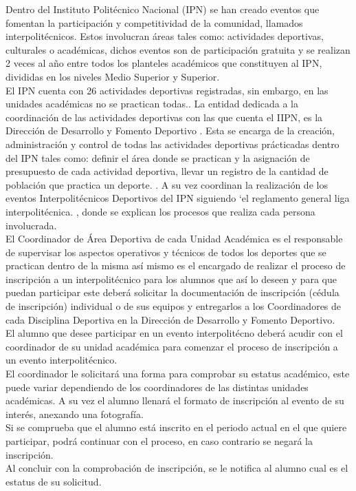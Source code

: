 	\noindent Dentro del Instituto Politécnico Nacional (IPN) se han creado eventos que fomentan la participación y competitividad de la comunidad, llamados interpolitécnicos. Estos involucran áreas tales como: actividades deportivas, culturales o académicas, dichos eventos son de participación gratuita y se realizan 2 veces al año entre todos los planteles académicos que constituyen al IPN, divididas en los niveles Medio Superior y Superior.  \cite{Reglas}\\
	\noindent El IPN cuenta con 26 actividades deportivas registradas, sin embargo, en las unidades académicas no se practican todas.\cite{Reglas}.
	\noindent La entidad dedicada a la coordinación de las actividades deportivas con las que cuenta el IIPN, es la Dirección de Desarrollo y Fomento Deportivo \cite{DDYFD}. Esta se encarga de la creación, administración y control de todas las actividades deportivas prácticadas dentro del IPN tales como: definir el área donde se practican y la asignación de presupuesto de cada actividad deportiva, llevar un registro de la cantidad de población que practica un deporte. \cite{Reglamento}.	
	\noindent A su vez coordinan la realización de los eventos Interpolitécnicos Deportivos del IPN siguiendo ‘el reglamento general liga interpolitécnica. \cite{Reglamento}, donde se explican los  procesos que realiza cada persona involucrada.\\
	
	\noindent El Coordinador de Área Deportiva de cada Unidad Académica es el responsable de supervisar los aspectos operativos y técnicos de todos los deportes que se practican dentro de la misma así mismo es el encargado de realizar el proceso de inscripción a un interpolitécnico para los alumnos que así lo deseen y para que puedan participar este deberá solicitar la documentación de inscripción (cédula de inscripción) individual o de sus equipos y entregarlos a los Coordinadores de cada Disciplina Deportiva en la Dirección de Desarrollo y Fomento Deportivo. \cite{Reglamento} \\
	\noindent  El alumno que desee participar en un evento interpolitécno deberá acudir con el coordinador de su unidad académica para comenzar el proceso de inscripción a un evento interpolitécnico. 
	\\El coordinador le solicitará una forma para comprobar su estatus académico, este puede variar dependiendo de los coordinadores de las distintas unidades académicas. A su vez el alumno llenará el formato de inscripción al evento de su interés, anexando una fotografía. 
	\\ Si se comprueba que el alumno está inscrito en el periodo actual en el que quiere participar, podrá continuar con el proceso, en caso contrario se negará la inscripción. \cite{Reglamento}
	\\ Al concluir con la comprobación de inscripción, se le notifica al alumno cual es el estatus de su solicitud. 
	
